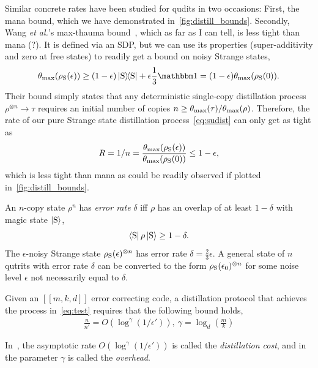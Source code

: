 \documentclass[pra,
aps,
twocolumn,
superscriptaddress,
groupedaddress,
nofootinbib,
reprint
]{revtex4-1}
\begin{document}
Similar concrete rates have been studied for qudits in two occasions:
First, the mana bound, which we have demonstrated in~\cref{fig:distill_bounds}.
Secondly, Wang \textit{et al.}'s max-thauma bound~\cite{Wang2020}, which as far as I can tell, is less tight than mana (?).
It is defined via an SDP, but we can use its properties (super-additivity and zero at free states) to readily get a bound on noisy Strange states,
\begin{equation}
	\theta_{\rm{max}}(\rho_{\rm{S}}(\epsilon)) \geq (1-\epsilon) \ketbra{\rm{S}} + \epsilon \frac{1}{3}\id = (1-\epsilon) \theta_{\rm{max}}(\rho_{\rm{S}}(0)).
\end{equation}
Their bound simply states that any deterministic single-copy distillation process $\rho^{\otimes n} \longrightarrow \tau$ requires an initial number of copies $n \geq \theta_{\rm{max}}(\tau) / \theta_{\rm{max}}(\rho)$.
Therefore, the rate of our pure Strange state distillation process~\cref{eq:sudist} can only get as tight as
\begin{equation}
	R = 1/n = \frac{\theta_{\rm{max}}(\rho_{\rm{S}}(\epsilon))}{\theta_{\rm{max}}(\rho_{\rm{S}}(0))} \leq 1-\epsilon,
\end{equation}
which is less tight than mana as could be readily observed if plotted in~\cref{fig:distill_bounds}.

An $n$-copy state $\rho^n$ has \emph{error rate} $\delta$ iff $\rho$ has an overlap of at least $1-\delta$ with magic state $\ket{\rm{S}}$,
\begin{equation}
	\bra{\rm{S}}\rho\ket{\rm{S}} \geq 1-\delta.
\end{equation}
The $\epsilon$-noisy Strange state $\rho_{\rm{S}}(\epsilon)^{\otimes n}$ has error rate $\delta = \frac{2}{3}\epsilon$.
A general state of $n$ qutrits with error rate $\delta$ can be converted to the form $\rho_{\rm{S}}(\epsilon_0)^{\otimes n}$ for some noise level $\epsilon$ not necessarily equal to $\delta$.

Given an $[[m,k,d]]$ error correcting code, a distillation protocol that achieves the process in~\cref{eq:test} requires that the following bound holds,
\begin{align}
	\frac{n}{n'} = O(\log^\gamma{(1/\epsilon')}),\ \gamma = \log_d{\left(\frac{m}{k}\right)}
\end{align}

In~\cite{Bravyi2012,Hastings2018}, the asymptotic rate $O(\log^\gamma{(1/\epsilon')})$ is called the \emph{distillation cost}, and in~\cite{cit:bravyi,Krishna2019} the parameter $\gamma$ is called the \emph{overhead}.
\end{document}
